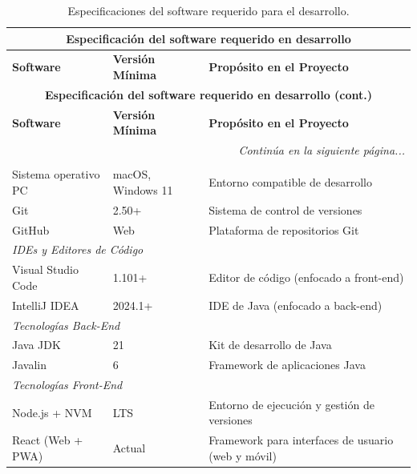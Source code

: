 \begin{longtable}{|p{}|p{}|p{}|}
    \caption{Especificaciones del software requerido para el desarrollo.}
    \label{tab:software_desarrollo} \\
    \hline
    \multicolumn{3}{|c|}{\textbf{Especificación del software requerido en desarrollo}} \\
    \hline
    \textbf{Software} & \textbf{Versión Mínima} & \textbf{Propósito en el Proyecto} \\
    \hline
    \endfirsthead

    \hline
    \multicolumn{3}{|c|}{\textbf{Especificación del software requerido en desarrollo (cont.)}} \\
    \hline
    \textbf{Software} & \textbf{Versión Mínima} & \textbf{Propósito en el Proyecto} \\
    \hline
    \endhead
    \hline
    \multicolumn{3}{|r|}{\small\textit{Continúa en la siguiente página...}} \\
    \hline
    \endfoot
    \hline
    \endlastfoot

    \multicolumn{3}{|l|}{\textit{Entorno y Control de Versiones}} \\ \hline
    Sistema operativo PC & macOS, Windows 11 & Entorno compatible de desarrollo \\
    Git & 2.50+ & Sistema de control de versiones \\
    GitHub & Web & Plataforma de repositorios Git \\ \hline

    \multicolumn{3}{|l|}{\textit{IDEs y Editores de Código}} \\ \hline
    Visual Studio Code & 1.101+ & Editor de código (enfocado a front-end) \\
    IntelliJ IDEA & 2024.1+ & IDE de Java (enfocado a back-end) \\ \hline

    \multicolumn{3}{|l|}{\textit{Tecnologías Back-End}} \\ \hline
    Java JDK & 21 & Kit de desarrollo de Java \\
    Javalin & 6 & Framework de aplicaciones Java \\ \hline

    \multicolumn{3}{|l|}{\textit{Tecnologías Front-End}} \\ \hline
    Node.js + NVM & LTS & Entorno de ejecución y gestión de versiones \\
    React (Web + PWA) & Actual & Framework para interfaces de usuario (web y móvil) \\ \hline


\end{longtable}

